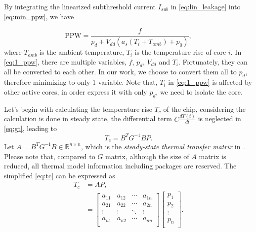 By integrating the linearized subthreshold current $I_{sub}$ in \eqref{eq:lin_leakage} into \eqref{eq:min_ppw}, we have

\begin{equation}\label{eq:1_ppw}
\text{PPW} = \frac{f}{p_{d}+V_{dd}(a_{s}(T_{i}+T_{amb})+p_{0})},
\end{equation}
where $T_{amb}$ is the ambient temperature, $T_{i}$ is the temperature rise of core $i$. In \eqref{eq:1_ppw}, there are multiple variables, $f$, $p_{d}$, $V_{dd}$ and $T_{i}$. Fortunately, they can all be converted to each other. In our work, we choose to convert them all to $p_{d}$, therefore minimizing to only $1$ variable. Note that, $T_{i}$ in \eqref{eq:1_ppw} is affected by other active cores, in order express it with only $p_{d}$, we need to isolate the core.

Let's begin with calculating the temperature rise $T_{c}$ of the chip, considering the calculation is done in steady state, the differential term $C\frac{dT(t)}{dt}$ is neglected in \eqref{eq:gt}, leading to
\begin{equation}\label{eq:tc}
T_{c} = B^{T}G^{-1}BP.
\end{equation}
Let $A = B^{T}G^{-1}B \in \mathbb{R}^{n \times n}$, which is the \emph{steady-state thermal transfer matrix} in~\cite{Reda:SJ'18}. Please note that, compared to $G$ matrix, although the size of $A$ matrix is reduced, all thermal model information including packages are reserved. The simplified 
\eqref{eq:tc} can be expressed as
\begin{equation}\label{eq:sim_tc}
\begin{split}
T_{c} &= AP,\\
&=
{\left[
\begin{matrix}
 a_{11} & a_{12} & \cdots & a_{1n} \\
 a_{21} & a_{22} & \cdots & a_{2n} \\
 \vdots & \vdots & \ddots & \vdots \\
 a_{n1} & a_{n2} & \cdots & a_{nn} \\
\end{matrix}
\right]}
{\left[
\begin{matrix}
 p_{1}   \\
 p_{2}   \\
 \vdots  \\
 p_{n}   \\
\end{matrix}
\right]}.\\
\end{split}
\end{equation}

